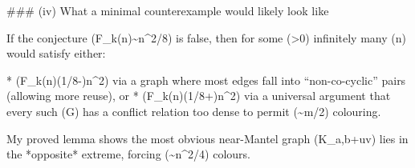 ### (iv) What a minimal counterexample would likely look like

If the conjecture (F_k(n)\sim n^2/8) is false, then for some (\varepsilon>0) infinitely many (n) would satisfy either:

* (F_k(n)\le (1/8-\varepsilon)n^2) via a graph where most edges fall into “non-co-cyclic” pairs (allowing more reuse), or
* (F_k(n)\ge (1/8+\varepsilon)n^2) via a universal argument that every such (G) has a conflict relation too dense to permit (\sim m/2) colouring.

My proved lemma shows the most obvious near-Mantel graph (K_{a,b}+uv) lies in the *opposite* extreme, forcing (\sim n^2/4) colours.
